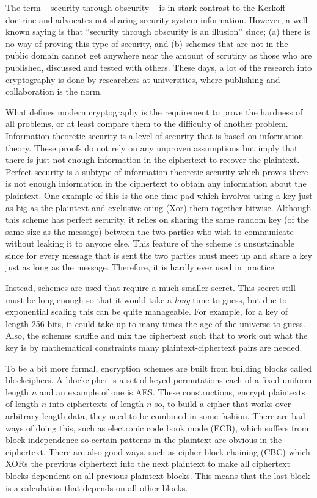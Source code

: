\documentclass[ %
                    author={Samuel Russell},
                supervisor={Prof. Bogdan Warinschi},
                    degree={MEng},
                     title={Innocuous Ciphertexts},
                  subtitle={The DE-CENSOR Scheme},
                      type={Research},
                      year={2018} ]{dissertation}
\begin{document}
The term -- security through obscurity -- is in stark contrast to the Kerkoff doctrine and advocates not sharing security system information.
However, a well known saying is that ``security through obscurity is an illusion'' since; (a) there is no way of proving this type of security, and (b) schemes that are not in the public domain cannot get anywhere near the amount of scrutiny as those who are published, discussed and tested with others.
These days, a lot of the research into cryptography is done by researchers at universities, where publishing and collaboration is the norm.

What defines modern cryptography is the requirement to prove the hardness of all problems, or at least compare them to the difficulty of another problem.
Information theoretic security is a level of security that is based on information theory.
These proofs do not rely on any unproven assumptions but imply that there is just not enough information in the ciphertext to recover the plaintext.
Perfect security is a subtype of information theoretic security which proves there is not enough information in the ciphertext to obtain any information about the plaintext.
One example of this is the one-time-pad which involves using a key just as big as the plaintext and exclusive-oring (Xor) them together bitwise.
Although this scheme has perfect security, it relies on sharing the same random key (of the same size as the message) between the two parties who wish to communicate without leaking it to anyone else.
This feature of the scheme is unsustainable since for every message that is sent the two parties must meet up and share a key just as long as the message.
Therefore, it is hardly ever used in practice.

Instead, schemes are used that require a much smaller secret.
This secret still must be long enough so that it would take a \textit{long} time to guess, but due to exponential scaling this can be quite manageable.
For example, for a key of length 256 bits, it could take up to many times the age of the universe to guess.
Also, the schemes shuffle and mix the ciphertext such that to work out what the key is by mathematical constraints many plaintext-ciphertext pairs are needed.

To be a bit more formal, encryption schemes are built from building blocks called blockciphers.
A blockcipher is a set of keyed permutations each of a fixed uniform length $n$ and an example of one is AES.
These constructions, encrypt plaintexts of length $n$ into ciphertexts of length $n$ so, to build a cipher that works over arbitrary length data, they need to be combined in some fashion.
There are bad ways of doing this, such as electronic code book mode (ECB), which suffers from block independence so certain patterns in the plaintext are obvious in the ciphertext.
There are also good ways, such as cipher block chaining (CBC) which XORs the previous ciphertext into the next plaintext to make all ciphertext blocks dependent on all previous plaintext blocks.
This means that the last block is a calculation that depends on all other blocks.
\end{document}
